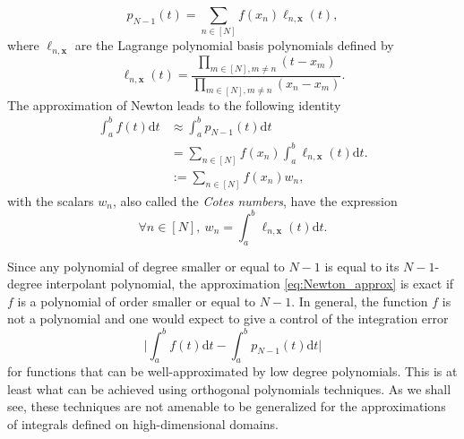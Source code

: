 \documentclass[twoside,11pt]{book}
\DeclareMathOperator{\X}{\mathcal{X}}
\begin{document}
\begin{equation}
p_{N-1}(t) = \sum\limits_{n \in [N]} f(x_{n}) \ell_{n,\bm{x}}(t),
\end{equation}
where $\ell_{n,\bm{x}}$ are the Lagrange polynomial basis polynomials defined by
\begin{equation}
\ell_{n,\bm{x}}(t) = \frac{\prod\limits_{m \in [N], m \neq n }(t-x_{m})}{\prod\limits_{m \in [N], m \neq n }(x_{n}-x_{m})}.
\end{equation}
The approximation of Newton leads to the following identity
\begin{align}\label{eq:Newton_approx}
\int_{a}^{b}f(t)\mathrm{d}t & \approx \int_{a}^{b}p_{N-1}(t)\mathrm{d}t  \\
& =  \sum\limits_{n \in [N]}f(x_{n}) \int_{a}^{b} \ell_{n,\bm{x}}(t) \mathrm{d}t.\\
& :=  \sum\limits_{n \in [N]}f(x_{n}) w_{n} ,
\end{align}
with the scalars $w_{n}$, also called the \emph{Cotes numbers}, have the expression
\begin{equation}
\forall n \in [N], \: w_{n} = \int_{a}^{b} \ell_{n,\bm{x}}(t) \mathrm{d}t.
\end{equation}

Since any polynomial of degree smaller or equal to $N-1$ is equal to its $N-1$-degree interpolant polynomial, the approximation \eqref{eq:Newton_approx} is exact if $f$ is a polynomial of order smaller or equal to $N-1$. In general, the function $f$ is not a polynomial and one would expect to give a control of the integration error 
\begin{equation}
\bigg|\int_{a}^{b}f(t)\mathrm{d}t - \int_{a}^{b}p_{N-1}(t)\mathrm{d}t \bigg| 
\end{equation}
for functions that can be well-approximated by low degree polynomials. This is at least what can be achieved using orthogonal polynomials techniques. As we shall see, these techniques are not amenable to be generalized for the approximations of integrals defined on high-dimensional domains.



\end{document}

